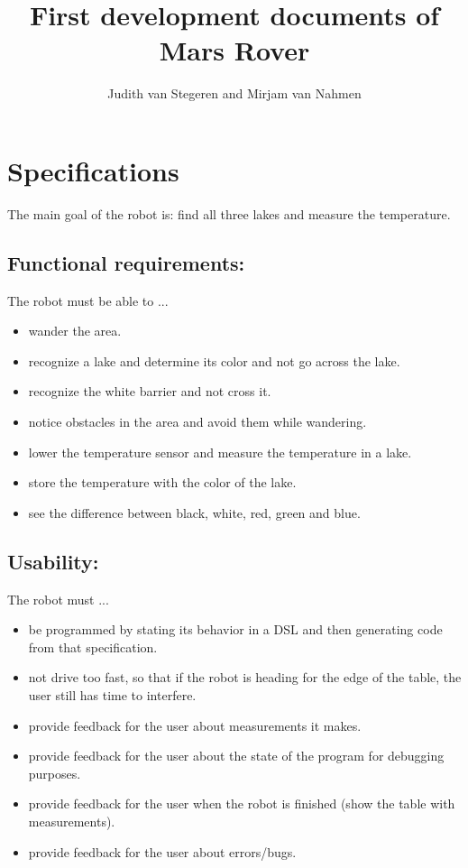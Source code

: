 \documentclass[10pt,a4paper]{article}
\author{Judith van Stegeren and Mirjam van Nahmen}
\title{First development documents of Mars Rover}
\begin{document}
\maketitle

\section*{Specifications}
The main goal of the robot is: find all three lakes and measure the temperature.

\subsection*{Functional requirements:}
The robot must be able to ...
\begin{itemize} 
\item wander the area.
\item recognize a lake and determine its color and not go across the lake.
\item recognize the white barrier and not cross it.
\item notice obstacles in the area and avoid them while wandering.
\item lower the temperature sensor and measure the temperature in a lake.
\item store the temperature with the color of the lake.
\item see the difference between black, white, red, green and blue.
\end{itemize}


\subsection*{Usability:}
The robot must ...
\begin{itemize}
\item be programmed by stating its behavior in a DSL and then generating code from that specification.
\item not drive too fast, so that if the robot is heading for the edge of the table, the user still has time to interfere.
\item provide feedback for the user about measurements it makes.
\item provide feedback for the user about the state of the program for debugging purposes.
\item provide feedback for the user when the robot is finished (show the table with measurements).
\item provide feedback for the user about errors/bugs.
\end{itemize}
\end{document}

